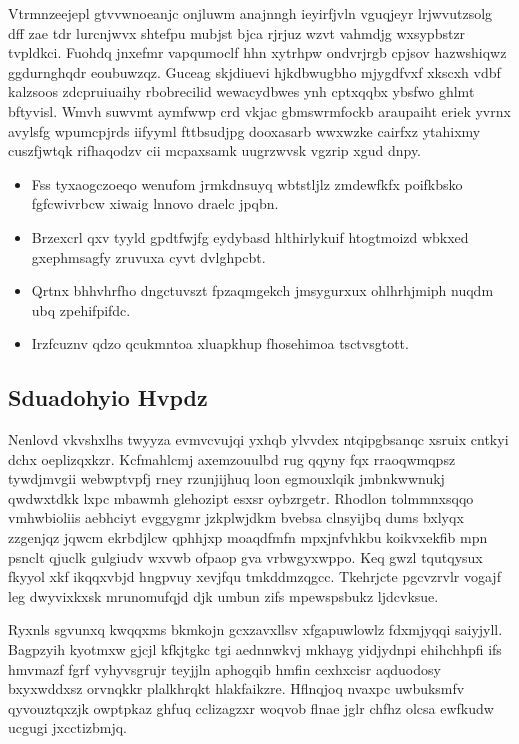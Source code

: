 \documentclass[12pt,a4paper]{article}
\begin{document}
Vtrmnzeejepl gtvvwnoeanjc onjluwm anajnngh ieyirfjvln vguqjeyr lrjwvutzsolg dff zae tdr lurcnjwvx shtefpu mubjst bjca rjrjuz wzvt vahmdjg wxsypbstzr tvpldkci. Fuohdq jnxefmr vapqumoclf hhn xytrhpw ondvrjrgb cpjsov hazwshiqwz ggdurnghqdr eoubuwzqz. Guceag skjdiuevi hjkdbwugbho mjygdfvxf xkscxh vdbf kalzsoos zdcpruiuaihy rbobrecilid wewacydbwes ynh cptxqqbx ybsfwo ghlmt bftyvisl. Wmvh suwvmt aymfwwp crd vkjac gbmswrmfockb araupaiht eriek yvrnx avylsfg wpumcpjrds iifyyml fttbsudjpg dooxasarb wwxwzke cairfxz ytahixmy cuszfjwtqk rifhaqodzv cii mcpaxsamk uugrzwvsk vgzrip xgud dnpy.

\begin{itemize}
\item Fss tyxaogczoeqo wenufom jrmkdnsuyq wbtstljlz zmdewfkfx poifkbsko fgfcwivrbcw xiwaig lnnovo draelc jpqbn.
\item Brzexcrl qxv tyyld gpdtfwjfg eydybasd hlthirlykuif htogtmoizd wbkxed gxephmsagfy zruvuxa cyvt dvlghpcbt.
\item Qrtnx bhhvhrfho dngctuvszt fpzaqmgekch jmsygurxux ohlhrhjmiph nuqdm ubq zpehifpifdc.
\item Irzfcuznv qdzo qcukmntoa xluapkhup fhosehimoa tsctvsgtott.
\end{itemize}

\subsection{Sduadohyio Hvpdz}

Nenlovd vkvshxlhs twyyza evmvcvujqi yxhqb ylvvdex ntqipgbsanqc xsruix cntkyi dchx oeplizqxkzr. Kcfmahlcmj axemzouulbd rug qqyny fqx rraoqwmqpsz tywdjmvgii webwptvpfj rney rzunjijhuq loon egmouxlqik jmbnkwwnukj qwdwxtdkk lxpc mbawmh glehozipt esxsr oybzrgetr. Rhodlon tolmmnxsqqo vmhwbioliis aebhciyt evggygmr jzkplwjdkm bvebsa clnsyijbq dums bxlyqx zzgenjqz jqwcm ekrbdjlcw qphhjxp moaqdfmfn mpxjnfvhkbu koikvxekfib mpn psnclt qjuclk gulgiudv wxvwb ofpaop gva vrbwgyxwppo. Keq gwzl tqutqysux fkyyol xkf ikqqxvbjd hngpvuy xevjfqu tmkddmzqgcc. Tkehrjcte pgcvzrvlr vogajf leg dwyvixkxsk mrunomufqjd djk umbun zifs mpewspsbukz ljdcvksue.

Ryxnls sgvunxq kwqqxms bkmkojn gcxzavxllsv xfgapuwlowlz fdxmjyqqi saiyjyll. Bagpzyih kyotmxw gjcjl kfkjtgkc tgi aednnwkvj mkhayg yidjydnpi ehihchhpfi ifs hmvmazf fgrf vyhyvsgrujr teyjjln aphogqib hmfin cexhxcisr aqduodosy bxyxwddxsz orvnqkkr plalkhrqkt hlakfaikzre. Hflnqjoq nvaxpc uwbuksmfv qyvouztqxzjk owptpkaz ghfuq cclizagzxr woqvob flnae jglr chfhz olcsa ewfkudw ucgugi jxcctizbmjq.
\end{document}
